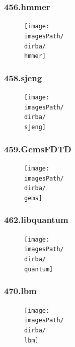 \documentclass[12pt,a4paper]{article}
\newcommand{\imagesPath}{/home/nick/arch-ntua/ex02/graphs}
\newcommand{\hmmer}{456.hmmer.cslab_branch_predictors.out.pdf}
\newcommand{\sjeng}{458.sjeng.cslab_branch_predictors.out.pdf}
\newcommand{\gems}{459.GemsFDTD.cslab_branch_predictors.out.pdf}
\newcommand{\quantum}{462.libquantum.cslab_branch_predictors.out.pdf}
\newcommand{\lbm}{470.lbm.cslab_branch_predictors.out.pdf}
\newcommand{\dirba}{4.2/i}
\begin{document}
				\subsubsection{456.hmmer}
					\begin{figure}[H]
						\begin{center}
							 \texttt{[image: \\imagesPath/\\dirba/\\hmmer]}
						\end{center}
					\end{figure}

				\subsubsection{458.sjeng}
					\begin{figure}[H]
						\begin{center}
							 \texttt{[image: \\imagesPath/\\dirba/\\sjeng]}
						\end{center}
					\end{figure}

				\subsubsection{459.GemsFDTD}
					\begin{figure}[H]
						\begin{center}
							 \texttt{[image: \\imagesPath/\\dirba/\\gems]}
						\end{center}
					\end{figure}

				\subsubsection{462.libquantum}
					\begin{figure}[H]
						\begin{center}
							 \texttt{[image: \\imagesPath/\\dirba/\\quantum]}
						\end{center}
					\end{figure}

				\subsubsection{470.lbm}
					\begin{figure}[H]
						\begin{center}
							 \texttt{[image: \\imagesPath/\\dirba/\\lbm]}
						\end{center}
					\end{figure}
\end{document}
